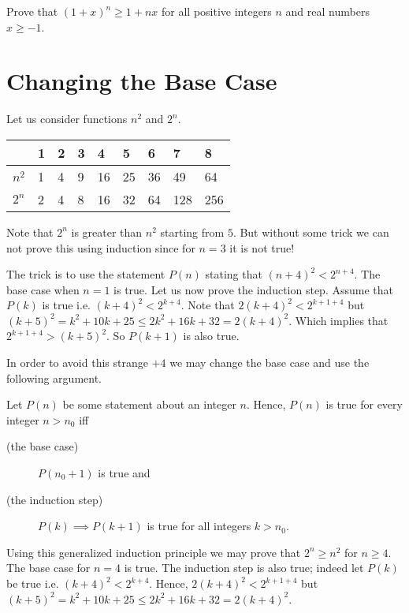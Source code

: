 \begin{exercise}
  Prove that $(1 + x)^n \ge 1 + nx$ for all positive integers $n$ and real
  numbers $x \ge -1$.
\end{exercise}

\section{Changing the Base Case}
Let us consider functions $n^2$ and $2^n$.

\begin{center}
    \begin{tabular}{l  l  l  l  l  l  l  l  l}
        \toprule
              & 1 & 2 & 3 & 4  & 5  & 6  & 7   & 8   \\
        \midrule
        $n^2$ & 1 & 4 & 9 & 16 & 25 & 36 & 49  & 64  \\
        $2^n$ & 2 & 4 & 8 & 16 & 32 & 64 & 128 & 256 \\
        \bottomrule
    \end{tabular}
\end{center}
Note that $2^n$ is greater than $n^2$ starting from $5$. But without some trick
we can not prove this using induction since for $n = 3$ it is not true!

The trick is to use the statement $P(n)$ stating that $(n + 4)^2 < 2^{n + 4}$.
The base case when $n = 1$ is true.
Let us now prove the induction step. Assume that $P(k)$ is true i.e.
$(k + 4)^2 < 2^{k + 4}$. Note that $2(k + 4)^2 < 2^{k + 1 + 4}$ but
$(k + 5)^2 = k^2 + 10k + 25 \le 2k^2 + 16k + 32 = 2(k + 4)^2$.
Which implies that
$2^{k + 1 + 4} > (k + 5)^2$. So $P(k + 1)$ is also true.

In order to avoid this strange $+4$ we may change the base
case and use the following argument.

\begin{theorem}
\label{theorem:induction-shifted-base}
    Let $P(n)$ be some statement about an integer $n$.
    Hence, $P(n)$ is true for every integer $n > n_0$ iff
    \begin{description}
        \item [(the base case)] $P(n_0 + 1)$ is true and
        \item [(the induction step)] $P(k) \implies P(k + 1)$ is true for all
            integers $k > n_0$.
    \end{description}
\end{theorem}

Using this generalized induction principle we may prove that $2^n \ge n^2$ for
$n \ge 4$. The base case for $n = 4$ is true. The induction step is also true;
indeed let $P(k)$ be true i.e. $(k + 4)^2 < 2^{k + 4}$. Hence,
$2(k + 4)^2 < 2^{k + 1 + 4}$ but
$(k + 5)^2 = k^2 + 10k + 25 \le 2k^2 + 16k + 32 = 2(k + 4)^2$.

